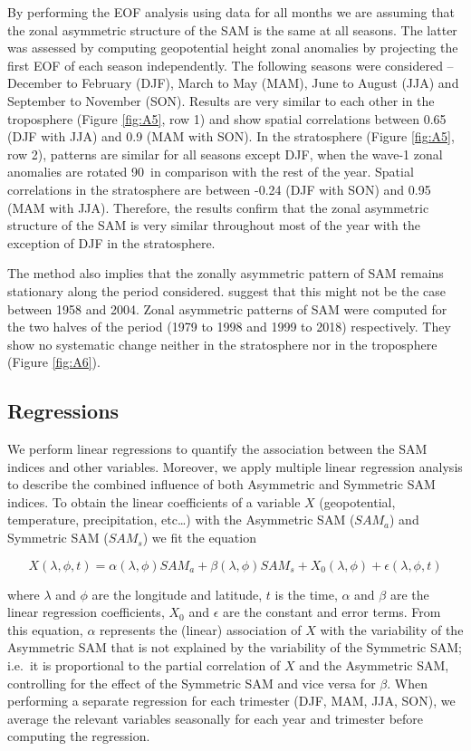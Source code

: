 \documentclass[smallextended]{svjour3}       %
\begin{document}
By performing the EOF analysis using data for all months we are assuming that the zonal asymmetric structure of the SAM is the same at all seasons. The latter was assessed by computing geopotential height zonal anomalies by projecting the first EOF of each season independently. The following seasons were considered -- December to February (DJF), March to May (MAM), June to August (JJA) and September to November (SON). Results are very similar to each other in the troposphere (Figure \ref{fig:A5}, row 1) and show spatial correlations between 0.65 (DJF with JJA) and 0.9 (MAM with SON). In the stratosphere (Figure \ref{fig:A5}, row 2), patterns are similar for all seasons except DJF, when the wave-1 zonal anomalies are rotated 90\degree~in comparison with the rest of the year. Spatial correlations in the stratosphere are between -0.24 (DJF with SON) and 0.95 (MAM with JJA). Therefore, the results confirm that the zonal asymmetric structure of the SAM is very similar throughout most of the year with the exception of DJF in the stratosphere.

The method also implies that the zonally asymmetric pattern of SAM remains stationary along the period considered. \citet{silvestri2009} suggest that this might not be the case between 1958 and 2004. Zonal asymmetric patterns of SAM were computed for the two halves of the period (1979 to 1998 and 1999 to 2018) respectively. They show no systematic change neither in the stratosphere nor in the troposphere (Figure \ref{fig:A6}).

\hypertarget{regressions}{%
\subsection{Regressions}\label{regressions}}

We perform linear regressions to quantify the association between the SAM indices and other variables. Moreover, we apply multiple linear regression analysis to describe the combined influence of both Asymmetric and Symmetric SAM indices. To obtain the linear coefficients of a variable \(X\) (geopotential, temperature, precipitation, etc\ldots{}) with the Asymmetric SAM (\(SAM_a\)) and Symmetric SAM (\(SAM_s\)) we fit the equation

\[
X(\lambda, \phi, t) = \alpha(\lambda, \phi) SAM_a + \beta(\lambda, \phi) SAM_s + X_0(\lambda, \phi) +  \epsilon(\lambda, \phi, t)
\]

where \(\lambda\) and \(\phi\) are the longitude and latitude, \(t\) is the time, \(\alpha\) and \(\beta\) are the linear regression coefficients, \(X_0\) and \(\epsilon\) are the constant and error terms. From this equation, \(\alpha\) represents the (linear) association of \(X\) with the variability of the Asymmetric SAM that is not explained by the variability of the Symmetric SAM; i.e.~it is proportional to the partial correlation of \(X\) and the Asymmetric SAM, controlling for the effect of the Symmetric SAM and vice versa for \(\beta\). When performing a separate regression for each trimester (DJF, MAM, JJA, SON), we average the relevant variables seasonally for each year and trimester before computing the regression.
\end{document}
